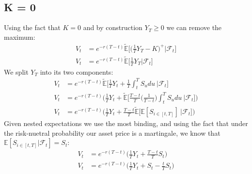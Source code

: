 \documentclass[a4paper,12pt]{article}
\begin{document}
\subsection{K = 0}
Using the fact that $K = 0$ and by construction $Y_T \geq 0$ we can remove the maximum:
\begin{align*}
V_t &= e^{-r(T -  t)} \tilde{\mathbb{E}}\bigg[ \bigg(\frac{1}{T}Y_T - K \bigg)^+ | \mathcal{F}_t \bigg] \\
V_t &= e^{-r(T -  t)} \tilde{\mathbb{E}}\big[ \frac{1}{T}Y_T | \mathcal{F}_t \big]
\end{align*}
%
We split $Y_T$ into its two components:
\begin{align*}
V_t &= e^{-r(T -  t)} \tilde{\mathbb{E}}\bigg[ \frac{1}{T}Y_t + \frac{1}{T} \int_t^T S_u du \ | \mathcal{F}_t \big] \\
V_t &= e^{-r(T -  t)} \bigg( \frac{1}{T}Y_t + \tilde{\mathbb{E}}\bigg[ \frac{T-t}{T} \bigg( \frac{1}{T-t} \bigg) \int_t^T S_u du \ | \mathcal{F}_t \big] \bigg) \\
V_t &= e^{-r(T -  t)} \bigg( \frac{1}{T}Y_t + \frac{T-t}{T} \tilde{\mathbb{E}}\bigg[  \mathbb{E} [S_{i \in [t,T]} ] \ | \mathcal{F}_t \bigg] \bigg)
\end{align*}
Given nested expectations we use the most binding, and using the fact that under the risk-nuetral probability our asset price is a martingale, we know that $\mathbb{E}[S_{i \in [t,T]} | \mathcal{F}_t] = S_t$:
\begin{align*}
V_t &= e^{-r(T -  t)} \bigg( \frac{1}{T}Y_t + \frac{T-t}{T} S_t  \bigg) \\
V_t &= e^{-r(T -  t)} \bigg( \frac{1}{T}Y_t + S_t - \frac{t}{T} S_t  \bigg)
\end{align*}
\end{document}
